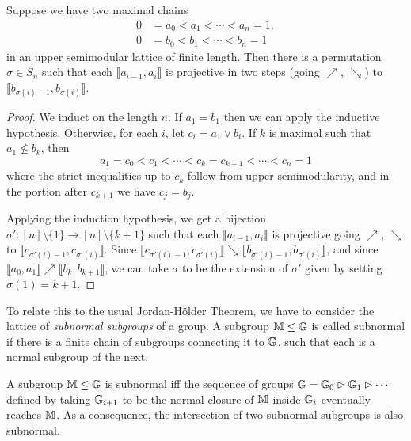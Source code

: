\begin{appendices}
\begin{thm} Suppose we have two maximal chains
\begin{align*}
0 &= a_0 < a_1 < \cdots < a_n = 1,\\
0 &= b_0 < b_1 < \cdots < b_n = 1
\end{align*}
in an upper semimodular lattice of finite length. Then there is a permutation $\sigma \in S_n$ such that each $\llbracket a_{i-1}, a_i\rrbracket$ is projective in two steps (going $\nearrow$, $\searrow$) to $\llbracket b_{\sigma(i)-1}, b_{\sigma(i)} \rrbracket$.
\end{thm}
\begin{proof} We induct on the length $n$. If $a_1 = b_1$ then we can apply the inductive hypothesis. Otherwise, for each $i$, let $c_i = a_1 \vee b_i$. If $k$ is maximal such that $a_1 \not\le b_k$, then
\[
a_1 = c_0 < c_1 < \cdots < c_k = c_{k+1} < \cdots < c_n = 1
\]
where the strict inequalities up to $c_k$ follow from upper semimodularity, and in the portion after $c_{k+1}$ we have $c_j = b_j$.

Applying the induction hypothesis, we get a bijection $\sigma' : [n]\setminus\{1\} \rightarrow [n]\setminus\{k+1\}$ such that each $\llbracket a_{i-1}, a_i\rrbracket$ is projective going $\nearrow$, $\searrow$ to $\llbracket c_{\sigma'(i)-1}, c_{\sigma'(i)} \rrbracket$. Since $\llbracket c_{\sigma'(i)-1}, c_{\sigma'(i)} \rrbracket \searrow \llbracket b_{\sigma'(i)-1}, b_{\sigma'(i)} \rrbracket$, and since $\llbracket a_0, a_1 \rrbracket \nearrow \llbracket b_k, b_{k+1}\rrbracket$, we can take $\sigma$ to be the extension of $\sigma'$ given by setting $\sigma(1) = k+1$.
\end{proof}

To relate this to the usual Jordan-H\"older Theorem, we have to consider the lattice of \emph{subnormal subgroups} of a group. A subgroup $\mathbb{M} \le \mathbb{G}$ is called subnormal if there is a finite chain of subgroups connecting it to $\mathbb{G}$, such that each is a normal subgroup of the next.

\begin{prop} A subgroup $\mathbb{M} \le \mathbb{G}$ is subnormal iff the sequence of groups $\mathbb{G} = \mathbb{G}_0 \rhd \mathbb{G}_1 \rhd \cdots$ defined by taking $\mathbb{G}_{i+1}$ to be the normal closure of $\mathbb{M}$ inside $\mathbb{G}_i$ eventually reaches $\mathbb{M}$. As a consequence, the intersection of two subnormal subgroups is also subnormal.
\end{prop}


\end{appendices}
